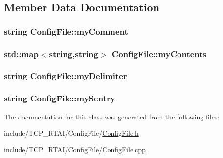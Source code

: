 \subsection{Member Data Documentation}
\hypertarget{classConfigFile_a2c60a141e8ad012b86a0642ec8ec638d}{
\subsubsection[{myComment}]{\setlength{\rightskip}{0pt plus 5cm}string {\bf ConfigFile::myComment}}}
\label{classConfigFile_a2c60a141e8ad012b86a0642ec8ec638d}
\hypertarget{classConfigFile_a91b9b9e241d42bd3b1bb8b3e6355761f}{
\subsubsection[{myContents}]{\setlength{\rightskip}{0pt plus 5cm}std::map$<$string,string$>$ {\bf ConfigFile::myContents}}}
\label{classConfigFile_a91b9b9e241d42bd3b1bb8b3e6355761f}
\hypertarget{classConfigFile_ad63f3e259f665192b64fb3e83c701425}{
\subsubsection[{myDelimiter}]{\setlength{\rightskip}{0pt plus 5cm}string {\bf ConfigFile::myDelimiter}}}
\label{classConfigFile_ad63f3e259f665192b64fb3e83c701425}
\hypertarget{classConfigFile_af066ec1942c50848a055350029ebbca5}{
\subsubsection[{mySentry}]{\setlength{\rightskip}{0pt plus 5cm}string {\bf ConfigFile::mySentry}}}
\label{classConfigFile_af066ec1942c50848a055350029ebbca5}


The documentation for this class was generated from the following files:\begin{DoxyCompactItemize}
\item 
include/TCP\_\-RTAI/ConfigFile/\hyperlink{ConfigFile_8h}{ConfigFile.h}\item 
include/TCP\_\-RTAI/ConfigFile/\hyperlink{ConfigFile_8cpp}{ConfigFile.cpp}\end{DoxyCompactItemize}

